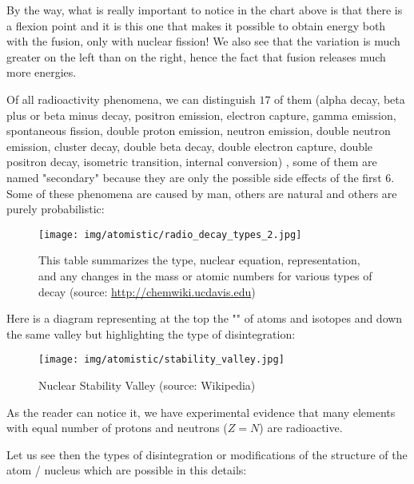	By the way, what is really important to notice in the chart above is that there is a flexion point and it is this one that makes it possible to obtain energy both with the fusion, only with nuclear fission! We also see that the variation is much greater on the left than on the right, hence the fact that fusion releases much more energies.

	Of all radioactivity phenomena, we can distinguish $17$ of them (alpha decay, beta plus or beta minus decay, positron emission, electron capture, gamma emission, spontaneous fission, double proton emission, neutron emission, double neutron emission, cluster decay, double beta decay, double electron capture, double positron decay, isometric transition, internal conversion) , some of them are named "secondary" because they are only the possible side effects of the first $6$. Some of these phenomena are caused by man, others are natural and others are purely probabilistic:
	\begin{figure}[H]
		\centering
		\texttt{[image: img/atomistic/radio\_decay\_types\_2.jpg]}
		\caption[Summary of the type, nuclear equation, representation, and any changes in the mass or atomic numbers for various types of decay]{This table summarizes the type, nuclear equation, representation, and any changes in the mass or atomic numbers for various types of decay (source: \url{http://chemwiki.ucdavis.edu})}
	\end{figure}
	Here is a diagram representing at the top the "\label{valley of stability}" of atoms and isotopes and down the same valley but highlighting the type of disintegration:
	\begin{figure}[H]
		\centering
		\texttt{[image: img/atomistic/stability\_valley.jpg]}
		\caption[Nuclear Stability Valley]{Nuclear Stability Valley (source: Wikipedia)}
	\end{figure}
	As the reader can notice it, we have experimental evidence that many elements with equal number of protons and neutrons ($Z=N$) are radioactive.
	
	Let us see then the types of disintegration or modifications of the structure of the atom / nucleus which are possible in this details:
	
